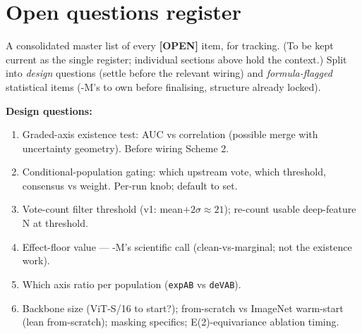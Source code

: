 \documentclass[11pt,a4paper]{article}
\newcommand{\opn}{\textcolor{openq}{\sffamily\bfseries[OPEN]}}
\begin{document}
\section{Open questions register}\label{sec:open}

A consolidated master list of every \opn{} item, for tracking. (To be kept current as the
single register; individual sections above hold the context.) Split into \emph{design}
questions (settle before the relevant wiring) and \emph{formula-flagged} statistical items
(-M's to own before finalising, structure already locked).

\textbf{Design questions:}
\begin{enumerate}[leftmargin=1.5em,itemsep=1pt]
\item Graded-axis existence test: AUC vs correlation (possible merge with uncertainty geometry). Before wiring Scheme 2.
\item Conditional-population gating: which upstream vote, which threshold, consensus vs weight. Per-run knob; default to set.
\item Vote-count filter threshold (v1: mean$+2\sigma \approx 21$); re-count usable deep-feature N at threshold.
\item Effect-floor value --- -M's scientific call (clean-vs-marginal; not the existence work).
\item Which axis ratio per population (\texttt{expAB} vs \texttt{deVAB}).
\item Backbone size (ViT-S/16 to start?); from-scratch vs ImageNet warm-start (lean from-scratch); masking specifics; E(2)-equivariance ablation timing.
\end{enumerate}
\end{document}

